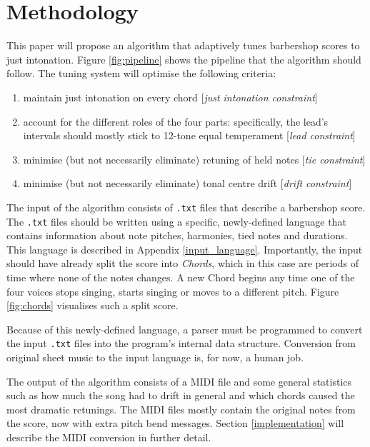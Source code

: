 \documentclass[a4paper]{article}
\begin{document}
\section{Methodology}
\label{methodoloy}
This paper will propose an algorithm that adaptively tunes barbershop scores to just intonation. Figure \ref{fig:pipeline} shows the pipeline that the algorithm should follow. The tuning system will optimise the following criteria:
\begin{enumerate}
	\item maintain just intonation on every chord [\textit{just intonation constraint}]
	\item account for the different roles of the four parts: specifically, the lead's intervals should mostly stick to 12-tone equal temperament [\textit{lead constraint}]
	\item minimise (but not necessarily eliminate) retuning of held notes [\textit{tie constraint}]
	\item minimise (but not necessarily eliminate) tonal centre drift [\textit{drift constraint}]
\end{enumerate}

The input of the algorithm consists of \verb+.txt+ files that describe a barbershop score. The \verb+.txt+ files should be written using a specific, newly-defined language that contains information about note pitches, harmonies, tied notes and durations. This language is described in Appendix \ref{input_language}. Importantly, the input should have already split the score into \textit{Chords}, which in this case are periods of time where none of the notes changes. A new Chord begins any time one of the four voices stops singing, starts singing or moves to a different pitch. Figure \ref{fig:chords} visualises such a split score.

Because of this newly-defined language, a parser must be programmed to convert the input \verb+.txt+ files into the program's internal data structure. Conversion from original sheet music to the input language is, for now, a human job.

The output of the algorithm consists of a MIDI file\cite{midi_manufacturers_association_complete_2014} and some general statistics such as how much the song had to drift in general and which chords caused the most dramatic retunings. The MIDI files mostly contain the original notes from the score, now with extra pitch bend messages. Section \ref{implementation} will describe the MIDI conversion in further detail.
\end{document}
